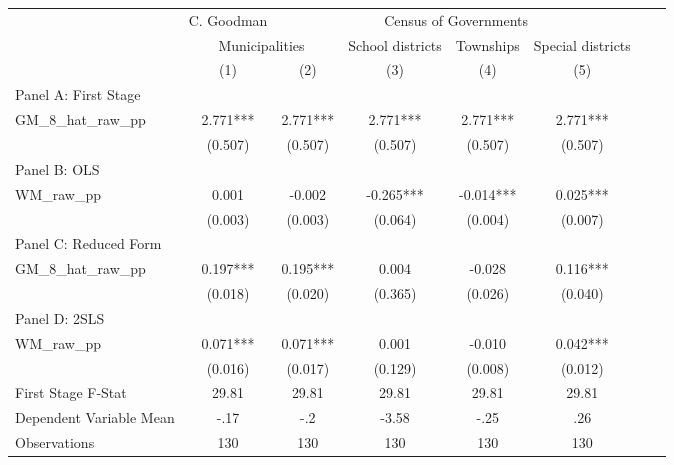  \begin{tabular}{l*{7}{c}} \toprule
&\multicolumn{1}{c}{C. Goodman}&\multicolumn{4}{c}{Census of Governments}\\\cmidrule(lr){2-2}\cmidrule(lr){3-6}
&\multicolumn{2}{c}{Municipalities}&\multicolumn{1}{c}{School districts}&\multicolumn{1}{c}{Townships}&\multicolumn{1}{c}{Special districts}\\\cmidrule(lr){2-3}\cmidrule(lr){4-6}
&\multicolumn{1}{c}{(1)}&\multicolumn{1}{c}{(2)}&\multicolumn{1}{c}{(3)}&\multicolumn{1}{c}{(4)}&\multicolumn{1}{c}{(5)}\\
\cmidrule(lr){1-6}
\multicolumn{5}{l}{Panel A: First Stage}\\
\cmidrule(lr){1-6}
GM\_8\_hat\_raw\_pp &    2.771***&    2.771***&    2.771***&    2.771***&    2.771***\\
                &  (0.507)   &  (0.507)   &  (0.507)   &  (0.507)   &  (0.507)   \\
\cmidrule(lr){1-6}
\multicolumn{5}{l}{Panel B: OLS}\\
\cmidrule(lr){1-6}
WM\_raw\_pp       &    0.001   &   -0.002   &   -0.265***&   -0.014***&    0.025***\\
                &  (0.003)   &  (0.003)   &  (0.064)   &  (0.004)   &  (0.007)   \\
\cmidrule(lr){1-6}
\multicolumn{5}{l}{Panel C: Reduced Form}\\
\cmidrule(lr){1-6}
GM\_8\_hat\_raw\_pp &    0.197***&    0.195***&    0.004   &   -0.028   &    0.116***\\
                &  (0.018)   &  (0.020)   &  (0.365)   &  (0.026)   &  (0.040)   \\
\cmidrule(lr){1-6}
\multicolumn{5}{l}{Panel D: 2SLS}\\
\cmidrule(lr){1-6}
WM\_raw\_pp       &    0.071***&    0.071***&    0.001   &   -0.010   &    0.042***\\
                &  (0.016)   &  (0.017)   &  (0.129)   &  (0.008)   &  (0.012)   \\
\midrule
First Stage F-Stat&    29.81   &    29.81   &    29.81   &    29.81   &    29.81   \\
Dependent Variable Mean&     -.17   &      -.2   &    -3.58   &     -.25   &      .26   \\
Observations    &      130   &      130   &      130   &      130   &      130   \\
       \bottomrule \end{tabular}
